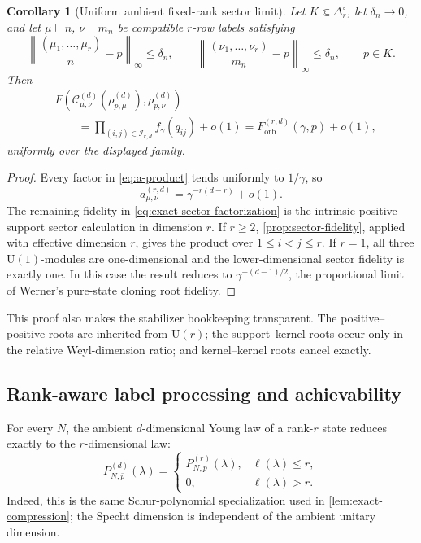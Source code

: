 \documentclass[11pt]{article}
\newtheorem{corollary}[corollary]{Corollary}
\theoremstyle{remark}
\theoremstyle{plain}
\newcommand{\cC}{\mathcal C}
\newcommand{\U}{\mathrm U}
\newcommand{\Forb}{F_{\mathrm{orb}}}
\begin{document}
\begin{corollary}[Uniform ambient fixed-rank sector limit]
\label{cor:rank-sector}
Let \(K\Subset\Delta_r^\circ\), let \(\delta_n\to0\), and let
\(\mu\vdash n\), \(\nu\vdash m_n\) be compatible \(r\)-row labels
satisfying
\[
  \left\|\frac{(\mu_1,\ldots,\mu_r)}n-p\right\|_\infty\le\delta_n,
  \qquad
  \left\|\frac{(\nu_1,\ldots,\nu_r)}{m_n}-p\right\|_\infty\le\delta_n,
  \qquad p\in K.
\]
Then
\begin{align*}
 &F\!\left(
   \cC_{\mu,\nu}^{(d)}(\rho_{\bar p,\mu}^{(d)}),
   \rho_{\bar p,\nu}^{(d)}
 \right)\\
 &\qquad=\prod_{(i,j)\in\mathcal I_{r,d}}f_\gamma(q_{ij})+o(1)
 =\Forb^{(r,d)}(\gamma,p)+o(1),
\end{align*}
uniformly over the displayed family.
\end{corollary}

\begin{proof}
Every factor in \eqref{eq:a-product} tends uniformly to \(1/\gamma\), so
\[
  a_{\mu,\nu}^{(r,d)}=\gamma^{-r(d-r)}+o(1).
\]
The remaining fidelity in \eqref{eq:exact-sector-factorization} is the
intrinsic positive-support sector calculation in dimension \(r\).  If
\(r\ge2\),
\cref{prop:sector-fidelity}, applied with effective dimension \(r\), gives the
product over \(1\le i<j\le r\).  If \(r=1\), all three
\(\U(1)\)-modules are one-dimensional and the lower-dimensional sector
fidelity is exactly one.  In this case the result reduces to
\(\gamma^{-(d-1)/2}\), the proportional limit of Werner's pure-state
cloning root fidelity.
\end{proof}

This proof also makes the stabilizer bookkeeping transparent.  The
positive--positive roots are inherited from \(\U(r)\); the support--kernel
roots occur only in the relative Weyl-dimension ratio; and kernel--kernel
roots cancel exactly.

\subsection{Rank-aware label processing and achievability}
\label{sec:rank-aware-achievability}

For every \(N\), the ambient \(d\)-dimensional Young law of a rank-\(r\)
state reduces exactly to the \(r\)-dimensional law:
\begin{equation}
  P_{N,\bar p}^{(d)}(\lambda)
  =\begin{cases}
    P_{N,p}^{(r)}(\lambda),&\ell(\lambda)\le r,\\
    0,&\ell(\lambda)>r.
  \end{cases}
  \label{eq:young-rank-reduction}
\end{equation}
Indeed, this is the same Schur-polynomial specialization used in
\cref{lem:exact-compression}; the Specht dimension is independent of the
ambient unitary dimension.
\end{document}
